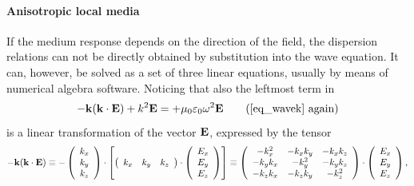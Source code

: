 \paragraph{Anisotropic local media}  %
If the medium response depends on the direction of the field, the dispersion relations can not be directly obtained by substitution into the wave equation. It can, however, be solved as a set of three linear equations, usually by means of numerical algebra software. Noticing that also the leftmost term in 
\begin{equation} - \kk (\kk \cdot \E)      +          k^2 \E            = +\mu_0 \varepsilon_0 \omega^{2} \E  \tag{\ref{eq_wavek} \again} \end{equation}
is a linear transformation of the vector $\mathbf{E}$, expressed by the tensor
$$ - {\mathbf{k}} ({\mathbf{k}} \cdot \mathbf{E}) \equiv 
	-\left(\begin{array}{c} k_x \\ k_y \\ k_z \end{array} \right) \cdot
	\left[\left(\begin{array}{ccc} k_x & k_y & k_z \end{array} \right) \cdot
	\left(\begin{array}{c} E_x \\ E_y \\ E_z \end{array} \right)\right] 
		\equiv
	\left(\begin{array}{ccc} -k_x^2 & -k_x k_y & -k_x k_z \\ -k_y k_x & -k_y^2 & -k_y k_z \\ -k_z k_x & -k_z k_y & -k_z^2 \end{array} \right) \cdot  
	\left(\begin{array}{c} E_x \\ E_y \\ E_z \end{array} \right),
	$$
